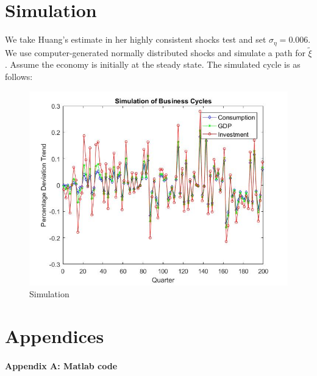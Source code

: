 \documentclass{article}
\begin{document}
\section{Simulation}
We take Huang's estimate in her highly consistent shocks test \cite{Huang}
and set $\sigma_\eta = 0.006$. We use computer-generated normally distributed shocks
and simulate a path for $\tilde\xi$. Assume the economy is initially at the steady state.
The simulated cycle is as follows:
\begin{figure}[ht]
    \centering
    \includegraphics[width=1\textwidth]{2.jpg}
    \caption{Simulation}
    \label{fig:2}
\end{figure}

\newpage
\section{Appendices}
\paragraph{Appendix A: Matlab code}
\noindent


\newpage
\printbibliography
\end{document}
